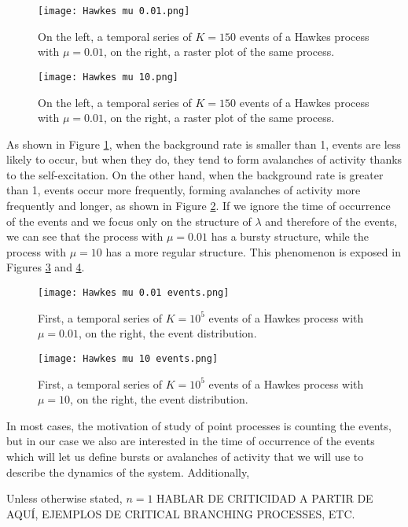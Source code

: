 \begin{figure}[H]
    \centering
    \texttt{[image: Hawkes mu 0.01.png]}
    \caption{On the left, a temporal series of $K=150$ events of a Hawkes process with $\mu=0.01$, on the right, a raster plot of the same process.}
    \label{f: Hawkes rate}
\end{figure}

\begin{figure}[H]
    \centering
    \texttt{[image: Hawkes mu 10.png]}
    \caption{On the left, a temporal series of $K=150$ events of a Hawkes process with $\mu=0.01$, on the right, a raster plot of the same process.}
    \label{f: Hawkes rate 2}
\end{figure}

As shown in Figure \ref{f: Hawkes rate}, when the background rate is smaller than 1, events are less likely to occur, but when they do, they tend to form avalanches of activity thanks 
to the self-excitation. On the other hand, when the background rate is greater than 1, events occur more frequently, forming avalanches of activity more frequently and longer, as
shown in Figure \ref{f: Hawkes rate 2}. If we ignore the time of occurrence of the events and we focus only on the structure of $\lambda$ and therefore of the events, we can see that
the process with $\mu=0.01$ has a bursty structure, while the process with $\mu=10$ has a more regular structure. This phenomenon is exposed in Figures \ref{f: Hawkes rate burst} and
\ref{f: Hawkes rate burst 2}.

\begin{figure}[H]
    \centering
    \texttt{[image: Hawkes mu 0.01 events.png]}
    \caption{First, a temporal series of $K=10^5$ events of a Hawkes process with $\mu=0.01$, on the right, the event distribution.}
    \label{f: Hawkes rate burst}    
\end{figure}

\begin{figure}[H]
    \centering
    \texttt{[image: Hawkes mu 10 events.png]}
    \caption{First, a temporal series of $K=10^5$ events of a Hawkes process with $\mu=10$, on the right, the event distribution.}
    \label{f: Hawkes rate burst 2}    
\end{figure}

In most cases, the motivation of study of point processes is counting the events, but in our case we also are interested in the time of occurrence of the events
which will let us define bursts or avalanches of activity that we will use to describe the dynamics of the system. Additionally, 



Unless otherwise stated, $n=1$ HABLAR DE CRITICIDAD A PARTIR DE AQUÍ, EJEMPLOS DE CRITICAL BRANCHING PROCESSES, ETC.